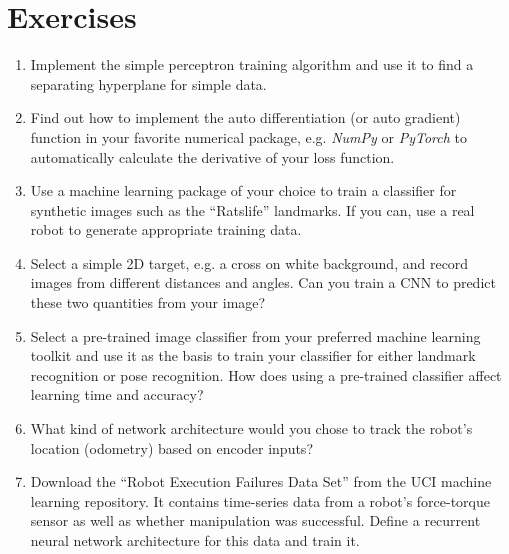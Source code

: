 \section{Exercises}
\begin{enumerate}
\item Implement the simple perceptron training algorithm and use it to find a separating hyperplane for simple data.
\item Find out how to implement the auto differentiation (or auto gradient) function in your favorite numerical package, e.g. \textsl{NumPy} or \textsl{PyTorch} to automatically calculate the derivative of your loss function.
\item Use a machine learning package of your choice to train a classifier for synthetic images such as the ``Ratslife'' landmarks. If you can, use a real robot to generate appropriate training data.
\item Select a simple 2D target, e.g. a cross on white background, and record images from different distances and angles. Can you train a CNN to predict these two quantities from your image?
\item Select a pre-trained image classifier from your preferred machine learning toolkit and use it as the basis to train your classifier for either landmark recognition or pose recognition. How does using a pre-trained classifier affect learning time and accuracy?
\item What kind of network architecture would you chose to track the robot's location (odometry) based on encoder inputs?
\item Download the ``Robot Execution Failures Data Set'' from the UCI machine learning repository. It contains time-series data from a robot's force-torque sensor as well as whether manipulation was successful. Define a recurrent neural network architecture for this data and train it.
\end{enumerate}



